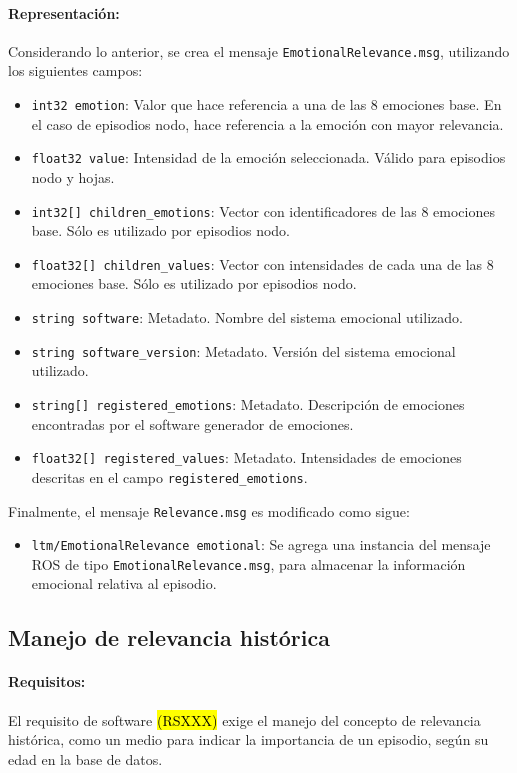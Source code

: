 \paragraph{Representación:}
Considerando lo anterior, se crea el mensaje \texttt{EmotionalRelevance.msg}, utilizando los siguientes campos:
\begin{itemize}
\item \texttt{int32 emotion}: Valor que hace referencia a una de las 8 emociones base. En el caso de episodios nodo, hace referencia a la emoción con mayor relevancia.
\item \texttt{float32 value}: Intensidad de la emoción seleccionada. Válido para episodios nodo y hojas.
\item \texttt{int32[] children\_emotions}: Vector con identificadores de las 8 emociones base. Sólo es utilizado por episodios nodo.
\item \texttt{float32[] children\_values}: Vector con intensidades de cada una de las 8 emociones base. Sólo es utilizado por episodios nodo.
\item \texttt{string software}: Metadato. Nombre del sistema emocional utilizado.
\item \texttt{string software\_version}: Metadato. Versión del sistema emocional utilizado.
\item \texttt{string[] registered\_emotions}: Metadato. Descripción de emociones encontradas por el software generador de emociones. 
\item \texttt{float32[] registered\_values}: Metadato. Intensidades de emociones descritas en el campo \texttt{registered\_emotions}.
\end{itemize}


Finalmente, el mensaje \texttt{Relevance.msg} es modificado como sigue:
\begin{itemize}
	\item \texttt{ltm/EmotionalRelevance emotional}: Se agrega una instancia del mensaje ROS de tipo \texttt{EmotionalRelevance.msg}, para almacenar la información emocional relativa al episodio.
\end{itemize}


\subsection{Manejo de relevancia histórica}

\paragraph{Requisitos:}
El requisito de software \hl{(RSXXX)} exige el manejo del concepto de relevancia histórica, como un medio para indicar la importancia de un episodio, según su edad en la base de datos. 

